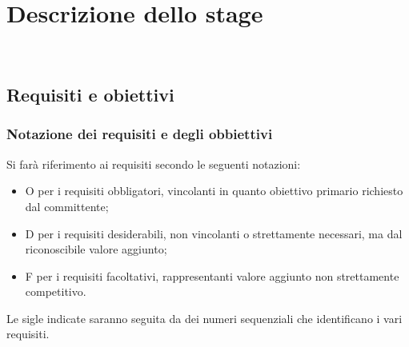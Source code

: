 
\chapter{Descrizione dello stage}
\label{descrizione-stage}

\\
\section{Requisiti e obiettivi}
\label{obiettivi-previsti}
\subsection*{Notazione dei requisiti e degli obbiettivi}
Si farà riferimento ai requisiti secondo le seguenti notazioni:
\begin{itemize}
  \item O per i requisiti obbligatori, vincolanti in quanto obiettivo primario richiesto dal committente;
  \item D per i requisiti desiderabili, non vincolanti o strettamente necessari, ma dal riconoscibile valore aggiunto;
  \item F per i requisiti facoltativi, rappresentanti valore aggiunto non strettamente competitivo.
\end{itemize}
Le sigle indicate saranno seguita da dei numeri sequenziali che identificano i vari requisiti.
